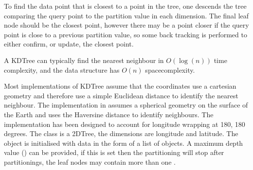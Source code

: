 \documentclass[letterpaper,10pt,english]{sphinxmanual}
\begin{document}
\sphinxAtStartPar
To find the data point that is closest to a point in the tree, one descends the tree comparing the query point to the
partition value in each dimension. The final leaf node should be the closest point, however there may be a point closer
if the query point is close to a previous partition value, so some back tracking is performed to either confirm, or
update, the closest point.

\sphinxAtStartPar
A K\sphinxhyphen{}D\sphinxhyphen{}Tree can typically find the nearest neighbour in \(O(\log(n))\) time complexity, and the data structure has
\(O(n)\) space\sphinxhyphen{}complexity.

\sphinxAtStartPar
Most implementations of K\sphinxhyphen{}D\sphinxhyphen{}Tree assume that the coordinates use a cartesian geometry and therefore use a simple
Euclidean distance to identify the nearest neighbour. The implementation in  assumes a
spherical geometry on the surface of the Earth and uses the Haversine distance to identify neighbours. The
implementation has been designed to account for longitude wrapping at \sphinxhyphen{}180, 180 degrees. The
 class is a 2\sphinxhyphen{}D\sphinxhyphen{}Tree, the dimensions are longitude and latitude. The object is
initialised with data in the form of a list of  objects. A maximum depth value
() can be provided, if this is set then the partitioning will stop after  partitionings,
the leaf nodes may contain more than one .
\end{document}
